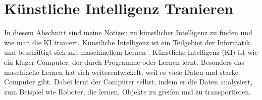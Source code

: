 \section{Künstliche Intelligenz Tranieren}
\label{sec:ai}

In diesem Abschnitt sind meine Notizen zu künstlicher Intelligenz zu finden und wie man die KI traniert.
\newline
Künstliche Intelligenz ist ein Teilgebiet der Informatik und beschäftigt sich mit maschinellem Lernen \citep{ai-wikipedia}.
\newline
Künstliche Intelligenz (KI) ist wie ein kluger Computer, der durch Programme oder Lernen lernt. Besonders das maschinelle Lernen hat sich weiterentwickelt, weil es viele Daten und starke Computer gibt. Dabei lernt der Computer selbst, indem er die Daten analysiert, zum Beispiel wie Roboter, die lernen, Objekte zu greifen und zu transportieren.